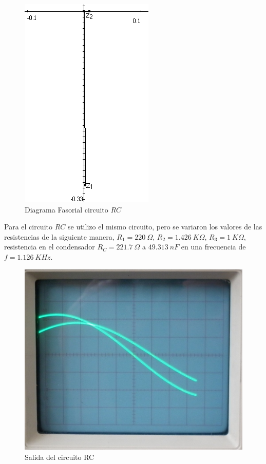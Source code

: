 \documentclass[twocolumn]{IEEEtran}
\begin{document}
\begin{figure}[H]
	\centering
		\includegraphics[scale=0.45]{fa2.png}
	\caption{Diagrama Fasorial circuito $RC$}
	\label{fig5}
\end{figure}
\noindent
Para el circuito $RC$ se utilizo el mismo circuito, pero se variaron los valores de las resistencias de la siguiente manera, $R_1 = 220\ \Omega$, $R_2 = 1.426\ K\Omega$, $R_3 = 1\ K\Omega$, resistencia en el condensador $R_C = 221.7\ \Omega$ a $49.313\ nF$ en una frecuencia de $f=1.126\ KHz$.\\
\begin{figure}[H]
	\centering
		\includegraphics[scale=0.15]{234.png}
	\caption{Salida del circuito RC}
	\label{figp3}
\end{figure}
\end{document}
